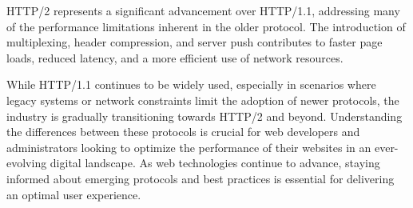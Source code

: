 HTTP/2 represents a significant advancement over HTTP/1.1, addressing many of the performance limitations inherent in the older protocol. The introduction of multiplexing, header compression, and server push contributes to faster page loads, reduced latency, and a more efficient use of network resources.

While HTTP/1.1 continues to be widely used, especially in scenarios where legacy systems or network constraints limit the adoption of newer protocols, the industry is gradually transitioning towards HTTP/2 and beyond. Understanding the differences between these protocols is crucial for web developers and administrators looking to optimize the performance of their websites in an ever-evolving digital landscape. As web technologies continue to advance, staying informed about emerging protocols and best practices is essential for delivering an optimal user experience.
